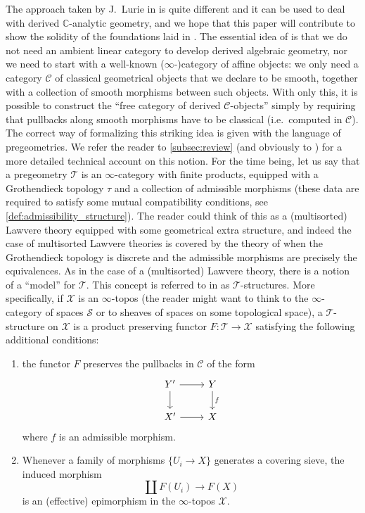\documentclass[12pt,a4paper,reqno]{amsart}
\theoremstyle{plain}
\theoremstyle{definition}
\theoremstyle{remark}
\numberwithin{equation}{section}
\begin{document}
The approach taken by J.\ Lurie in \cite{DAG-V} is quite different and it can be used to deal with derived {$\mathbb C$-analytic\xspace} geometry, and we hope that this paper will contribute to show the solidity of the foundations laid in \cite{DAG-IX}.
The essential idea of \cite{DAG-V} is that we do not need an ambient linear category to develop derived algebraic geometry, nor we need to start with a well-known ($\infty$-)category of affine objects: we only need a category ${\mathcal C}$ of classical geometrical objects that we declare to be smooth, together with a collection of smooth morphisms between such objects. With only this, it is possible to construct the ``free category of derived ${\mathcal C}$-objects'' simply by requiring that pullbacks along smooth morphisms have to be classical (i.e.\ computed in ${\mathcal C}$).
The correct way of formalizing this striking idea is given with the language of pregeometries. We refer the reader to \cref{subsec:review} (and obviously to \cite{DAG-V}) for a more detailed technical account on this notion. For the time being, let us say that a pregeometry ${\mathcal T}$ is an $\infty$-category with finite products, equipped with a Grothendieck topology $\tau$ and a collection of admissible morphisms (these data are required to satisfy some mutual compatibility conditions, see \cref{def:admissibility_structure}).
The reader could think of this as a (multisorted) Lawvere theory equipped with some geometrical extra structure, and indeed the case of multisorted Lawvere theories is covered by the theory of \cite{DAG-V} when the Grothendieck topology is discrete and the admissible morphisms are precisely the equivalences.
As in the case of a (multisorted) Lawvere theory, there is a notion of a ``model'' for ${\mathcal T}$. This concept is referred to in \cite{DAG-V} as ${\mathcal T}$-structures. More specifically, if ${\mathcal X}$ is an $\infty$-topos (the reader might want to think to the $\infty$-category of spaces ${\mathcal S}$ or to sheaves of spaces on some topological space), a ${\mathcal T}$-structure on ${\mathcal X}$ is a product preserving functor $F \colon {\mathcal T} \to {\mathcal X}$ satisfying the following additional conditions:
\begin{enumerate}
	\item the functor $F$ preserves the pullbacks in ${\mathcal C}$ of the form
	\[ \begin{tikzcd}
		Y' \arrow{d} \arrow{r} & Y \arrow{d}{f} \\
		X' \arrow{r} & X
	\end{tikzcd} \]
	where $f$ is an admissible morphism.
	\item Whenever a family of morphisms $\{U_i \to X\}$ generates a covering sieve, the induced morphism
	\[ \coprod F(U_i) \to F(X) \]
	is an (effective) epimorphism in the $\infty$-topos ${\mathcal X}$.
\end{enumerate}
\end{document}
